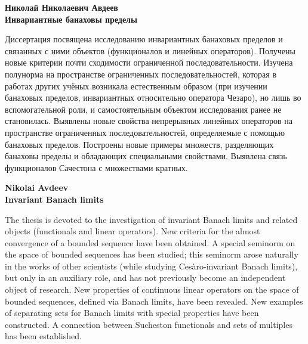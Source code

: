 \begin{center}
	\textbf{
		Николай Николаевич Авдеев
		\\
		Инвариантные банаховы пределы
	}
\end{center}



Диссертация посвящена исследованию инвариантных банаховых пределов и связанных с ними объектов
(функционалов и линейных операторов).
Получены новые критерии почти сходимости ограниченной последовательности.
Изучена полунорма на пространстве ограниченных последовательностей,
которая в работах других учёных возникала естественным образом
(при изучении банаховых пределов, инвариантных относительно оператора Чезаро),
но лишь во вспомогательной роли, и самостоятельным объектом исследования ранее не становилась.
Выявлены новые свойства непрерывных линейных операторов на пространстве ограниченных последовательностей,
определяемые с помощью банаховых пределов.
Построены новые примеры множеств, разделяющих банаховы пределы и обладающих специальными свойствами.
Выявлена связь функционалов Сачестона с множествами кратных.

\medskip

\begin{center}
	\textbf{
		Nikolai Avdeev
		\\
		Invariant Banach limits
	}
\end{center}




The thesis is devoted to the investigation of invariant Banach limits and related objects (functionals and linear operators).
New criteria for the almost convergence of a bounded sequence have been obtained.
A special seminorm on the space of bounded sequences has been studied;
this seminorm arose naturally in the works of other scientists (while studying Cesàro-invariant Banach limits),
but only in an auxiliary role, and has not previously become an independent object of research.
New properties of continuous linear operators on the space of bounded sequences, defined via Banach limits, have been revealed.
New examples of separating sets for Banach limits with special properties have been constructed.
A connection between Sucheston functionals and sets of multiples has been established.
